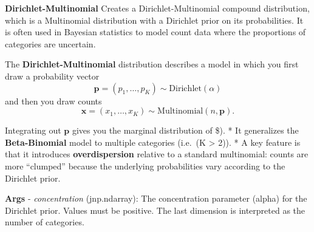 \documentclass[
  letterpaper,
  DIV=11,
  numbers=noendperiod]{scrartcl}
\begin{document}
\textbf{Dirichlet-Multinomial} Creates a Dirichlet-Multinomial compound
distribution, which is a Multinomial distribution with a Dirichlet prior
on its probabilities. It is often used in Bayesian statistics to model
count data where the proportions of categories are uncertain.

The \textbf{Dirichlet-Multinomial} distribution describes a model in
which you first draw a probability vector \[
\mathbf{p} = (p_1, \dots, p_K) \sim \mathrm{Dirichlet}(\alpha)
\] and then you draw counts \[
  \mathbf{x} = (x_1, \dots, x_K) \sim \mathrm{Multinomial}(n, \mathbf{p}).
\]

Integrating out \(\mathbf{p}\) gives you the marginal distribution of
\$). * It generalizes the \textbf{Beta-Binomial} model to
multiple categories (i.e.~(K \textgreater{} 2)). * A key feature is that
it introduces \textbf{overdispersion} relative to a standard
multinomial: counts are more ``clumped'' because the underlying
probabilities vary according to the Dirichlet prior.

\textbf{Args} - \emph{concentration} (jnp.ndarray): The concentration
parameter (alpha) for the Dirichlet prior. Values must be positive. The
last dimension is interpreted as the number of categories.
\end{document}
